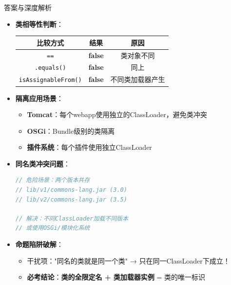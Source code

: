 \documentclass[12pt, a4paper]{ctexart}
\begin{document}
\begin{bluebox}{答案与深度解析}
\begin{itemize}[label={}, leftmargin=*, nosep]
\begin{itemize}[label={}, leftmargin=*, nosep]
	\item \textbf{类相等性判断}：
	      \begin{center}
		      \begin{tabular}{|c|c|c|}
			      \hline
			      \textbf{比较方式}               & \textbf{结果}    & \textbf{原因} \\
			      \hline
			      \texttt{==}                 & \textbf{false} & 类对象不同       \\
			      \hline
			      \texttt{.equals()}          & \textbf{false} & 同上          \\
			      \hline
			      \texttt{isAssignableFrom()} & \textbf{false} & 不同类加载器产生    \\
			      \hline
		      \end{tabular}
	      \end{center}

	\item \textbf{隔离应用场景}：
	      \begin{itemize}[label={}, nosep]
		      \item \textbf{Tomcat}：每个webapp使用独立的ClassLoader，避免类冲突
		      \item \textbf{OSGi}：Bundle级别的类隔离
		      \item \textbf{插件系统}：每个插件使用独立ClassLoader
	      \end{itemize}

	\item \textbf{同名类冲突问题}：
	      \begin{lstlisting}[language=Java]
// 危险场景：两个版本共存
// lib/v1/commons-lang.jar (3.0)
// lib/v2/commons-lang.jar (3.5)

// 解决：不同ClassLoader加载不同版本
// 或使用OSGi/模块化系统
      \end{lstlisting}

	\item \textbf{命题陷阱破解}：
	      \begin{itemize}[label={}, nosep]
		      \item 干扰项："同名的类就是同一个类" → 只在同一ClassLoader下成立！
		      \item \textbf{必考结论}：\textbf{类的全限定名 + 类加载器实例} = 类的唯一标识
	      \end{itemize}
\end{itemize}
\end{itemize}


\end{bluebox}
\end{document}
